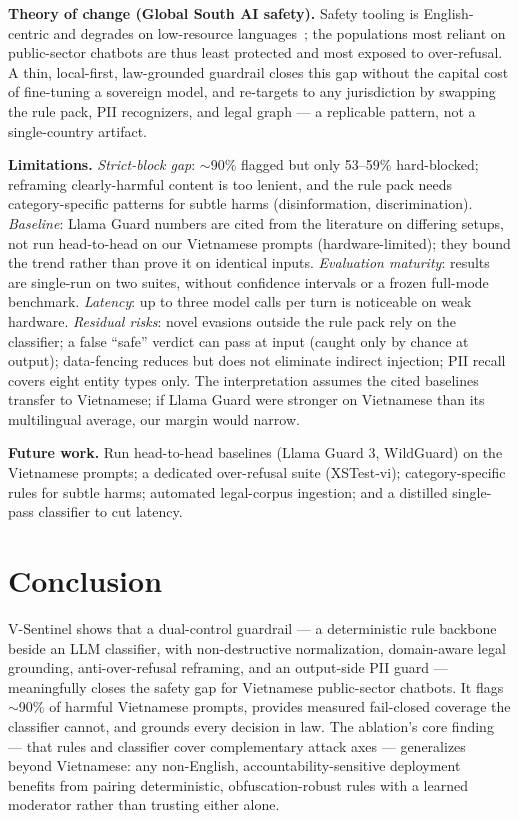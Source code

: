 \documentclass[11pt, a4paper]{article}
\begin{document}
\noindent\textbf{Theory of change (Global South AI safety).} Safety tooling is English-centric and degrades on low-resource languages~\cite{multitox,multijail}; the populations most reliant on public-sector chatbots are thus least protected and most exposed to over-refusal. A thin, local-first, law-grounded guardrail closes this gap without the capital cost of fine-tuning a sovereign model, and re-targets to any jurisdiction by swapping the rule pack, PII recognizers, and legal graph --- a replicable pattern, not a single-country artifact.

\noindent\textbf{Limitations.} \emph{Strict-block gap}: $\sim$90\% flagged but only 53--59\% hard-blocked; reframing clearly-harmful content is too lenient, and the rule pack needs category-specific patterns for subtle harms (disinformation, discrimination). \emph{Baseline}: Llama Guard numbers are cited from the literature on differing setups, not run head-to-head on our Vietnamese prompts (hardware-limited); they bound the trend rather than prove it on identical inputs. \emph{Evaluation maturity}: results are single-run on two suites, without confidence intervals or a frozen full-mode benchmark. \emph{Latency}: up to three model calls per turn is noticeable on weak hardware. \emph{Residual risks}: novel evasions outside the rule pack rely on the classifier; a false ``safe'' verdict can pass at input (caught only by chance at output); data-fencing reduces but does not eliminate indirect injection; PII recall covers eight entity types only. The interpretation assumes the cited baselines transfer to Vietnamese; if Llama Guard were stronger on Vietnamese than its multilingual average, our margin would narrow.

\noindent\textbf{Future work.} Run head-to-head baselines (Llama Guard 3, WildGuard) on the Vietnamese prompts; a dedicated over-refusal suite (XSTest-vi); category-specific rules for subtle harms; automated legal-corpus ingestion; and a distilled single-pass classifier to cut latency.

\section{Conclusion}
V-Sentinel shows that a dual-control guardrail --- a deterministic rule backbone beside an LLM classifier, with non-destructive normalization, domain-aware legal grounding, anti-over-refusal reframing, and an output-side PII guard --- meaningfully closes the safety gap for Vietnamese public-sector chatbots. It flags $\sim$90\% of harmful Vietnamese prompts, provides measured fail-closed coverage the classifier cannot, and grounds every decision in law. The ablation's core finding --- that rules and classifier cover complementary attack axes --- generalizes beyond Vietnamese: any non-English, accountability-sensitive deployment benefits from pairing deterministic, obfuscation-robust rules with a learned moderator rather than trusting either alone.
\end{document}

